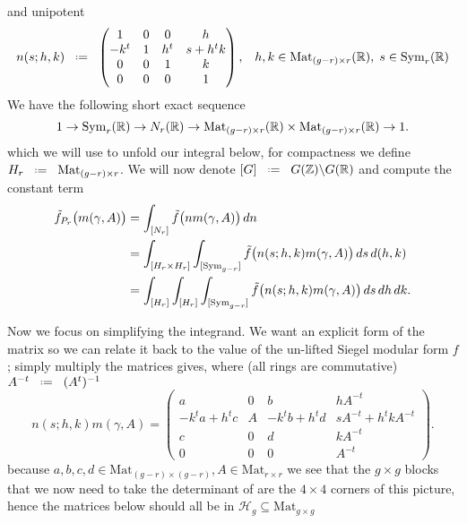 and unipotent 
\[ n(s;h,k) \defeq \begin{pmatrix} 1 & 0 & 0 & h\\ -k^t & 1 & h^t & s+h^t k\\ 0 & 0 & 1 & k\\ 0 & 0 & 0 & 1 \end{pmatrix}, \;\;\; h, k\in\mathrm{Mat}_{(g-r)\times r}(\R),\; s\in\mathrm{Sym}_{r}(\R)\]
We have the following short exact sequence 
\[ 1\to \mathrm{Sym}_{r}(\R)\to N_r(\R)\to \mathrm{Mat}_{(g-r)\times r}(\R)\times\mathrm{Mat}_{(g-r)\times r}(\R) \to 1. \]
which we will use to unfold our integral below, for compactness we define \(H_r \defeq \mathrm{Mat}_{(g-r)\times r}\). We will now denote \([G] \defeq G(\Z)\backslash G(\R)\) and compute the constant term
\begin{align}
	\tilde f_{P_r}\bigl(m(\gamma, A)\bigr)
	& = \int^{}_{[N_r]}\tilde f\bigl(n m(\gamma, A)\bigr)\,dn \notag\\
	& = \int^{}_{[H_r\times H_r]}\int^{}_{[\mathrm{Sym}_{g-r}]}\tilde f\bigl(n(s; h, k) m(\gamma, A)\bigr)\,ds\,d(h,k) \notag\\
	& = \int^{}_{[H_r]}\int^{}_{[H_r]}\int^{}_{[\mathrm{Sym}_{g-r}]}\tilde f\bigl(n(s; h, k) m(\gamma, A)\bigr)\,ds\,dh\,dk.
\end{align} 

Now we focus on simplifying the integrand. We want an explicit form of the matrix so we can relate it back to the value of the un-lifted Siegel modular form \(f\); simply multiply the matrices gives, where (all rings are commutative) \(A^{-t} \defeq (A^t)\inv\)
\[
n(s; h, k) m(\gamma, A) =
\begin{pmatrix}
	a & 0 & b & h A^{-t}\\
	-k^t a + h^t c & A & -k^t b + h^t d & s A^{-t} + h^t k A^{-t}\\
	c & 0 & d & k A^{-t}\\
	0 & 0 & 0 & A^{-t}
\end{pmatrix}.
\]
because \(a,b,c,d \in \mathrm{Mat}_{(g-r)\times (g-r)}, A \in \mathrm{Mat}_{r\times r}\) we see that the \(g\times g\) blocks that we now need to take the determinant of are the \(4\times 4\) corners of this picture, hence the matrices below should all be in \(\mathcal{H}_g\subseteq \mathrm{Mat}_{g\times g}\)

